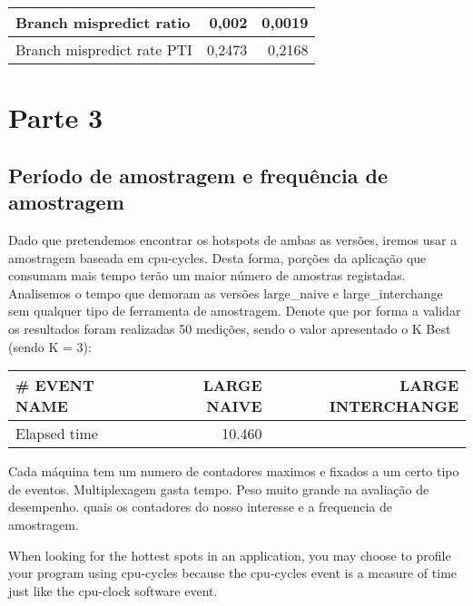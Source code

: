 \documentclass[conference,compsoc]{IEEEtran}
\begin{document}
\begin{table}[H]
\begin{tabular}{ | l | r | r |   }
  Branch mispredict ratio	 & 0,002   &     0,0019  \\ \hline      

  
  Branch mispredict rate PTI	 &  0,2473   &   0,2168    \\ \hline          
   
     \end{tabular}
  \end{table}
  
  
  
  \section{Parte 3 }

\subsection{Período de amostragem e frequência de amostragem}

Dado que pretendemos encontrar os hotspots de ambas as versões, iremos usar a amostragem baseada em cpu-cycles. Desta forma, porções da aplicação que consumam mais tempo terão um maior número de amostras registadas.
Analisemos o tempo que demoram as versões large\_naive e large\_interchange sem qualquer tipo de ferramenta de amostragem. Denote que por forma a validar os resultados foram realizadas 50 medições, sendo o valor apresentado o K Best (sendo K = 3):

 \begin{tabular}{ | l | r | r |   }

  \hline
  \# EVENT NAME	 & LARGE NAIVE  & LARGE INTERCHANGE \\ \hline 
   Elapsed time & 10.460 &  \\ \hline    
  \end{tabular}




Cada máquina tem um numero de contadores maximos e fixados a um certo tipo de eventos. Multiplexagem gasta tempo. 
Peso muito grande na avaliação de desempenho. quais os contadores do nosso interesse e a frequencia de amostragem. 


When looking for the hottest spots in an application, you may choose to profile your program using cpu-cycles because the cpu-cycles event is a measure of time just like the cpu-clock software event.
\end{document}
